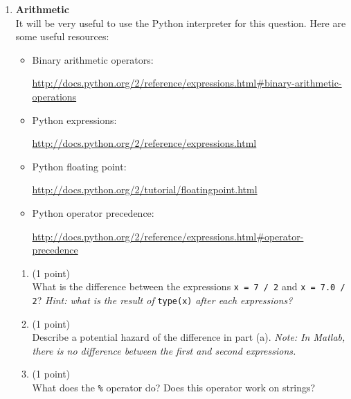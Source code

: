 \documentclass{article}
\newcounter{points}
\newcommand\setpoint{\addtocounter{points}{1}(1 point)}
\begin{document}
\begin{enumerate}
\item \textbf{Arithmetic} \\
It will be very useful to use the Python interpreter for this question.  Here are some useful resources:
\begin{itemize}
\item Binary arithmetic operators: 

\url{http://docs.python.org/2/reference/expressions.html#binary-arithmetic-operations}

\item Python expressions: 

\url{http://docs.python.org/2/reference/expressions.html}

\item Python floating point:

\url{http://docs.python.org/2/tutorial/floatingpoint.html}

\item Python operator precedence:

\url{http://docs.python.org/2/reference/expressions.html#operator-precedence}
\end{itemize}

\begin{enumerate}
\item \setpoint \\
What is the difference between the expressions \texttt{x = 7 / 2} and \texttt{x = 7.0 / 2}?  \emph{Hint: what is the result of} \texttt{type(x)} \emph{after each expressions?}
\end{enumerate}

\begin{enumerate}
\setcounter{enumii}{1}
\item \setpoint \\
Describe a potential hazard of the difference in part (a).  \emph{Note: In Matlab, there is no difference between the first and second expressions.}
\end{enumerate}

\begin{enumerate}
\setcounter{enumii}{2}
\item \setpoint \\
What does the \texttt{\%} operator do?  Does this operator work on strings?
\end{enumerate}


\end{enumerate}
\end{document}
